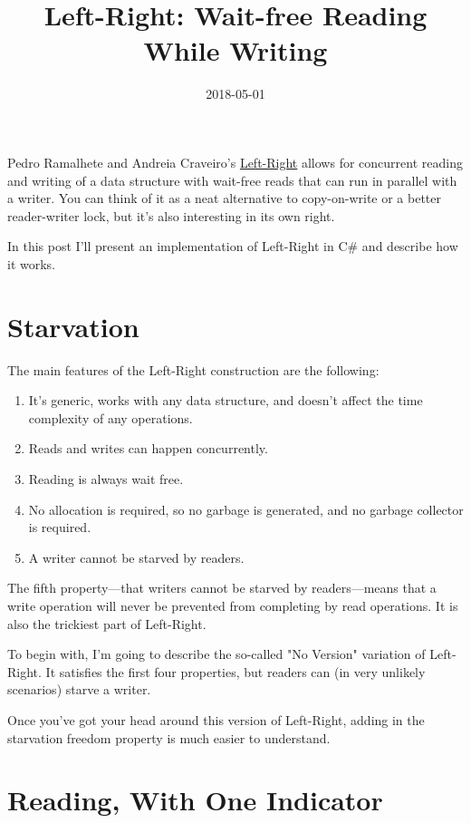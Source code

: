 \documentclass[11pt]{article}
\title{Left-Right: Wait-free Reading While Writing}
\date{2018-05-01}
\begin{document}
Pedro Ramalhete and Andreia Craveiro's \href{https://github.com/pramalhe/ConcurrencyFreaks/blob/master/papers/left-right-2014.pdf}{Left-Right} allows for concurrent reading and writing of a data structure with wait-free reads that can run in parallel with a writer. You can think of it as a neat alternative to copy-on-write or a better reader-writer lock, but it's also interesting in its own right.

In this post I'll present an implementation of Left-Right in C\# and describe how it works.

\section{Starvation}

The main features of the Left-Right construction are the following:

\begin{enumerate}
\item It's generic, works with any data structure, and doesn't affect the time complexity of any operations.

\item Reads and writes can happen concurrently.

\item Reading is always wait free.

\item No allocation is required, so no garbage is generated, and no garbage collector is required.

\item A writer cannot be starved by readers.
\end{enumerate}

The fifth property---that writers cannot be starved by readers---means that a write operation will never be prevented from completing by read operations. It is also the trickiest part of Left-Right.

To begin with, I'm going to describe the so-called "No Version" variation of Left-Right. It satisfies the first four properties, but readers can (in very unlikely scenarios) starve a writer.

Once you've got your head around this version of Left-Right, adding in the starvation freedom property is much easier to understand.

\section{Reading, With One Indicator}
\end{document}
